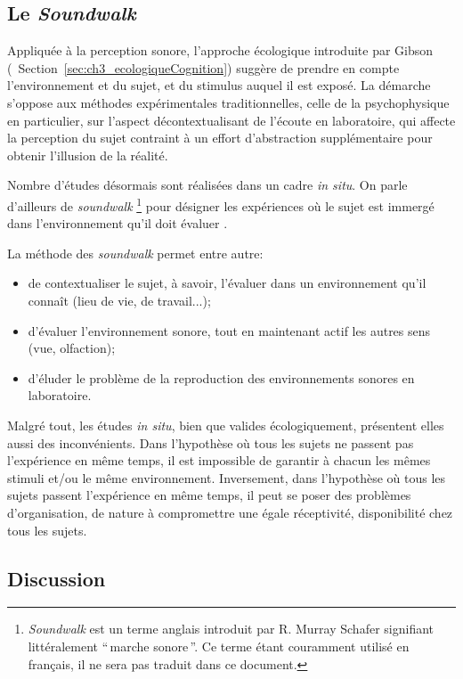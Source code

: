 \subsection{Le \emph{Soundwalk}}
\label{sec:ch3_soundwalk}

Appliquée à la perception sonore, l'approche écologique introduite par Gibson (\cf~Section~\ref{sec:ch3_ecologiqueCognition}) suggère de prendre en compte l'environnement et du sujet, et du stimulus auquel il est exposé. La démarche s'oppose aux méthodes expérimentales traditionnelles, celle de la psychophysique en particulier, sur l'aspect décontextualisant de l'écoute en laboratoire, qui affecte la perception du sujet contraint à un effort d'abstraction supplémentaire pour obtenir l'illusion de la réalité.

Nombre d'études désormais sont réalisées dans un cadre \emph{in situ}. On parle d'ailleurs de \emph{soundwalk}  \footnote{\emph{Soundwalk} est un terme anglais introduit par R. Murray Schafer \citep{schafer1969new} signifiant littéralement ``\,marche sonore\,''. Ce terme étant couramment utilisé en français, il ne sera pas traduit dans ce document.} pour désigner les expériences où le sujet est immergé dans l'environnement qu'il doit évaluer \citep{adams2008soundwalking,jeon2013soundwalk}.

La méthode des \emph{soundwalk} permet entre autre:

\begin{itemize}
\item  de contextualiser le sujet, à savoir, l'évaluer dans un environnement qu'il connaît (lieu de vie, de travail...);
\item d'évaluer l'environnement sonore, tout en maintenant actif les autres sens (vue, olfaction);
\item d'éluder le problème de la reproduction des environnements sonores en laboratoire.
\end{itemize}

Malgré tout, les études \emph{in situ}, bien que valides écologiquement, présentent elles aussi des inconvénients. Dans l'hypothèse où tous les sujets ne passent pas l'expérience en même temps, il est impossible de garantir à chacun les mêmes stimuli et/ou le même environnement. Inversement, dans l'hypothèse où tous les sujets passent l'expérience en même temps, il peut se poser des problèmes d'organisation, de nature à compromettre une égale réceptivité, disponibilité chez tous les sujets.

\subsection{Discussion}

